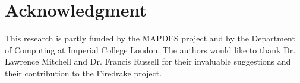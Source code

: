 \documentclass[conference]{IEEEtran}
\begin{document}
\section*{Acknowledgment}

This research is partly funded by the MAPDES project and by the Department of Computing at Imperial College London. The authors would like to thank Dr. Lawrence Mitchell and Dr. Francis Russell for their invaluable suggestions and their contribution to the Firedrake project.






\end{document}
